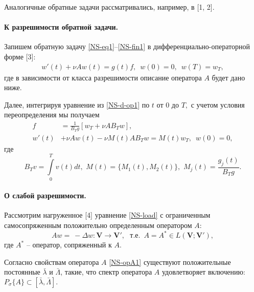 \documentclass{vzmsthesis}
\begin{document}
Аналогичные обратные задачи рассматривались, например, в [1, 2].

\paragraph{К разрешимости обратной задачи.}
Запишем обратную задачу \eqref{NS-eq1}--\eqref{NS-fin1} в дифференциально-операторной форме [3]:
\begin{align} \label{NS-d-op1}
w'(t)+\nu Aw(t)=g(t)f,\,\,\, w(0)=0,\,\,\, w(T)=w_T,
\end{align}
где в зависимости от класса разрешимости описание оператора $A$ будет дано ниже.

Далее, интегрируя уравнение из \eqref{NS-d-op1} по $t$ от $0$ до $T,$ с учетом условия переопределения мы получаем
\begin{align} \label{NS-unk1}
f&=\frac{1}{B_Tg}\left[w_{T}+\nu A B_Tw\right],\\
\label{NS-load}w'(t)&+\nu A w(t)-\nu M(t)A B_Tw
=M(t)w_{T},\,\,\, w(0)=0,
\end{align}
где
\begin{equation}\label{NS-def1}
B_Tv=\int\limits_0^Tv(t)dt,\,\, M(t)=\{M_1(t), M_2(t)\},\,\, M_j\left(t\right)=\frac{g_j\left(t\right)}{B_Tg}.
\end{equation}

\paragraph{О слабой разрешимости.}
Рассмотрим нагруженное [4] уравнение \eqref{NS-load} с ограниченным самосопряженным положительно определенным оператором $A$:
\begin{equation} \label{NS-opA1}
Aw=\ - \Delta w: \mathbf{V}\to\mathbf{V}',\,\, \textrm{ т.е. }\, A=A^*\in L(\mathbf{V};\mathbf{V}'),
\end{equation}
где $A^*$ -- оператор, сопряженный к $A.$

Согласно свойствам оператора $A$ \eqref{NS-opA1} существуют положительные постоянные $\bar{\lambda}$ и $\bar{\Lambda}$, такие, что спектр оператора $A$ удовлетворяет включению: $P_\sigma\{A\}\subset[\bar{\lambda},\bar{\Lambda}].$
\end{document}
